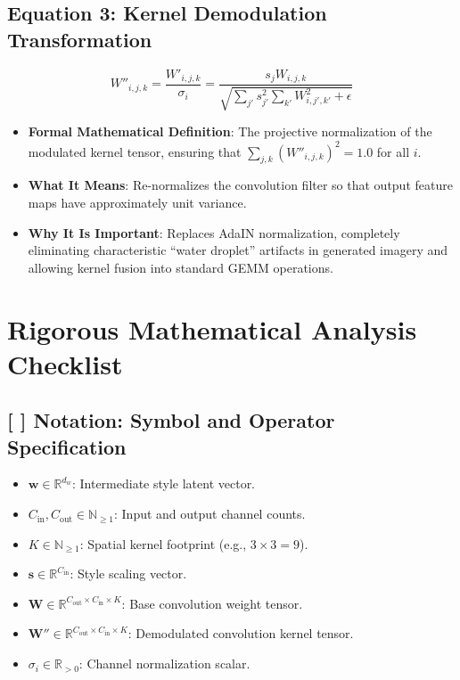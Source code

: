 \documentclass[11pt,a4paper]{article}
\theoremstyle{definition}
\begin{document}
\subsection{\textbf{Equation 3: Kernel Demodulation Transformation}}
{\boldmath
\begin{equation}
W''_{i, j, k} = \frac{W'_{i, j, k}}{\sigma_i} = \frac{s_j W_{i, j, k}}{\sqrt{\sum_{j'} s_{j'}^2 \sum_{k'} W_{i, j', k'}^2 + \epsilon}}
\end{equation}
}
\begin{itemize}
    \item \textbf{Formal Mathematical Definition}:
    The projective normalization of the modulated kernel tensor, ensuring that $\sum_{j, k} (W''_{i, j, k})^2 = 1.0$ for all $i$.
    \item \textbf{What It Means}:
    Re-normalizes the convolution filter so that output feature maps have approximately unit variance.
    \item \textbf{Why It Is Important}:
    Replaces AdaIN normalization, completely eliminating characteristic ``water droplet'' artifacts in generated imagery and allowing kernel fusion into standard GEMM operations.
\end{itemize}

\section{Rigorous Mathematical Analysis Checklist}

\subsection{[ ] Notation: Symbol and Operator Specification}
\begin{itemize}
    \item $\mathbf{w} \in \mathbb{R}^{d_w}$: Intermediate style latent vector.
    \item $C_{\text{in}}, C_{\text{out}} \in \mathbb{N}_{\ge 1}$: Input and output channel counts.
    \item $K \in \mathbb{N}_{\ge 1}$: Spatial kernel footprint (e.g., $3 \times 3 = 9$).
    \item $\mathbf{s} \in \mathbb{R}^{C_{\text{in}}}$: Style scaling vector.
    \item $\mathbf{W} \in \mathbb{R}^{C_{\text{out}} \times C_{\text{in}} \times K}$: Base convolution weight tensor.
    \item $\mathbf{W}'' \in \mathbb{R}^{C_{\text{out}} \times C_{\text{in}} \times K}$: Demodulated convolution kernel tensor.
    \item $\sigma_i \in \mathbb{R}_{> 0}$: Channel normalization scalar.
\end{itemize}
\end{document}
